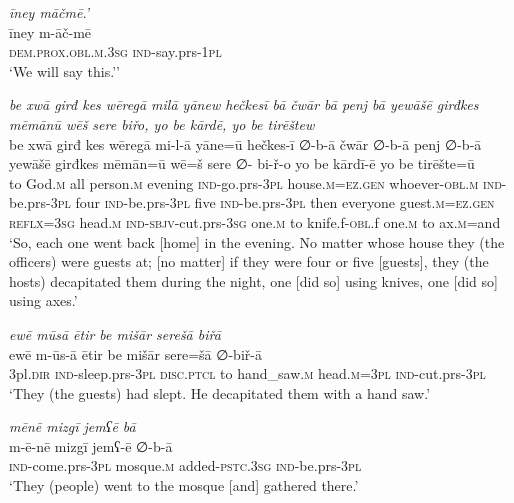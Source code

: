 \ea \label{BP.69}
\textit{īney māčmē.’} \\ 
\gll īney m-āč-mē \\ 
 \textsc{dem.prox}\textsc{.obl}\textsc{.m}\textsc{.3sg} \textsc{ind-}say.prs\textsc{-\textsc{1pl}} \\ 
\glt `We will say this.’'
\z 
 
\ea \label{BP.70}
\textit{be xwā girđ kes wēregā milā yānew hečkesī bā čwār bā penj bā yewāšē girđkes mēmānū wēš sere biřo, yo be kārdē, yo be tirēštew} \\ 
\gll be xwā girđ kes wēregā mi-l-ā yāne=ū hečkes-ī ∅-b-ā čwār ∅-b-ā penj ∅-b-ā yewāšē girđkes mēmān=ū wē=š sere ∅- bi-ř-o yo be kārdī-ē yo be tirēšte=ū \\ 
 to God\textsc{.m} all person\textsc{.m} evening \textsc{ind-}go.prs\textsc{-3pl} house\textsc{.m}\textsc{=ez.gen} whoever\textsc{-obl}\textsc{.m} \textsc{ind-}be.prs\textsc{-3pl} four \textsc{ind-}be.prs\textsc{-3pl} five \textsc{ind-}be.prs\textsc{-3pl} then everyone guest\textsc{.m}\textsc{=ez.gen} \textsc{reflx}\textsc{=3sg} head\textsc{.m} \textsc{ind-}\textsc{sbjv-}cut.prs\textsc{-3sg} one\textsc{.m} to knife.f\textsc{-obl}.f one\textsc{.m} to ax\textsc{.m}=and \\ 
\glt `So, each one went back [home] in the evening. No matter whose house they (the officers) were guests at; [no matter] if they were four or five [guests],  they  (the hosts) decapitated them during the night, one [did so] using knives, one [did so] using axes.'
\z 
 
\ea \label{BP.73}
\textit{ewē mūsā ētir be mišār serešā biřā} \\ 
\gll ewē m-ūs-ā ētir be mišār sere=šā ∅-biř-ā \\ 
 3pl\textsc{.dir} \textsc{ind-}sleep.prs\textsc{-3pl} \textsc{disc.ptcl} to hand\_saw\textsc{.m} head\textsc{.m}\textsc{=3pl} \textsc{ind-}cut.prs\textsc{-3pl} \\ 
\glt `They (the guests) had slept. He decapitated them with a hand saw.'
\z 
 
\ea \label{BP.75}
\textit{mēnē mizgī jemʕē bā} \\ 
\gll m-ē-nē mizgī jemʕ-ē ∅-b-ā \\ 
 \textsc{ind-}come.prs\textsc{-3pl} mosque\textsc{.m} added\textsc{-pstc}\textsc{.3sg} \textsc{ind-}be.prs\textsc{-3pl} \\ 
\glt `They (people) went to the mosque [and] gathered there.'
\z 
 
